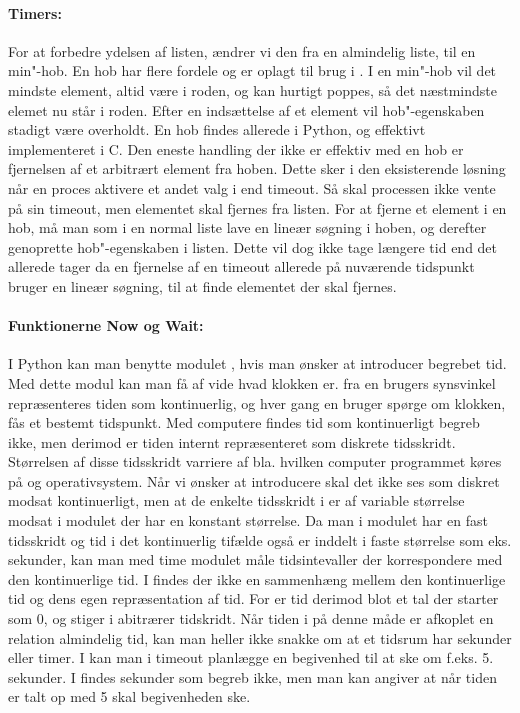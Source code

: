 \paragraph*{Timers:} For at forbedre ydelsen af  listen,
ændrer vi den fra en almindelig liste, til en min"-hob. En hob har
flere fordele og er oplagt til brug i \sched. I en min"-hob vil det
mindste element, altid være i roden, og kan hurtigt poppes, så det
næstmindste elemet nu står i roden. Efter en indsættelse af et
element vil hob"-egenskaben stadigt være overholdt. En hob findes
allerede i Python, og effektivt implementeret i C. Den eneste handling
der ikke er effektiv med en hob er fjernelsen af et arbitrært element
fra hoben. Dette sker i den eksisterende løsning når en proces
aktivere et andet valg i  end timeout. Så skal
processen ikke vente på sin timeout, men elementet skal fjernes fra
 listen. For at fjerne et element i en hob, må man som i
en normal liste lave en lineær søgning i hoben, og derefter genoprette
hob"-egenskaben i listen. Dette vil dog ikke tage længere tid end det
allerede tager da en fjernelse af en timeout allerede på nuværende
tidspunkt bruger en lineær søgning, til at finde elementet der skal
fjernes.


\paragraph*{Funktionerne Now og Wait:} I Python kan man benytte modulet
, hvis man ønsker at introducer begrebet tid. Med dette
modul kan man få af vide hvad klokken er. fra en brugers synsvinkel
repræsenteres tiden som kontinuerlig, og hver gang en bruger spørge
om klokken, fås et bestemt tidspunkt. Med computere findes tid som
kontinuerligt begreb ikke, men derimod er tiden internt repræsenteret
som diskrete tidsskridt. Størrelsen af disse tidsskridt varriere
af bla. hvilken computer programmet køres på og operativsystem.
Når vi ønsker at introducere \des skal det ikke ses som diskret
modsat kontinuerligt, men at de enkelte tidsskridt i \des er af
variable størrelse modsat i modulet  der har en konstant
størrelse. Da man i  modulet har en fast tidsskridt og
tid i det kontinuerlig tifælde også er inddelt i faste størrelse
som eks. sekunder, kan man med time modulet måle tidsintevaller der
korrespondere med den kontinuerlige tid. I \des findes der ikke en
sammenhæng mellem den kontinuerlige tid og dens egen repræsentation af
tid. For \des er tid derimod blot et tal der starter som 0, og stiger
i abitrærer tidskridt. Når tiden i \des på denne måde er afkoplet
en relation almindelig tid, kan man heller ikke snakke om at et tidsrum
har sekunder eller timer. I \pycsp kan man i timeout planlægge en
begivenhed til at ske om f.eks. 5. sekunder. I \des findes sekunder som
begreb ikke, men man kan angiver at når tiden er talt op med 5 skal
begivenheden ske. 


